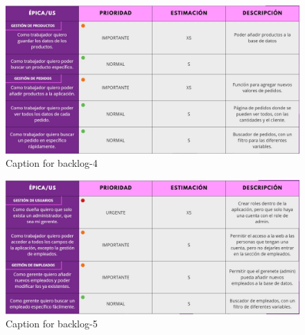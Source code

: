 \begin{figure}[h]
    \centering
    \includegraphics[width=1\textwidth]{figures/backlog-4.jpeg}
    \caption{Caption for backlog-4}
    \label{fig:backlog4}
\end{figure}

\begin{figure}[h]
    \centering
    \includegraphics[width=1\textwidth]{figures/backlog-5.jpeg}
    \caption{Caption for backlog-5}
    \label{fig:backlog5}
\end{figure}
